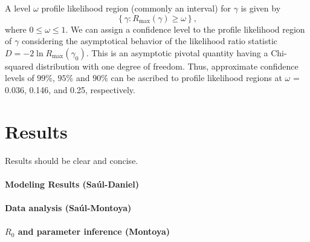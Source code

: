 A level $\omega$ profile likelihood region (commonly an interval) for $\gamma$ is given by
\begin{equation}
    \left\{\gamma: R_{\max}\left(\gamma\right) \geq \omega \right\}, \nonumber
\end{equation}
where $0 \leq \omega \leq 1$. We can assign a confidence level to the
profile likelihood region of $\gamma$  considering the asymptotical
behavior of the likelihood ratio statistic
$D=-2\ln{R_{\max}\left(\gamma_{0}\right)}$. This is an asymptotic
pivotal quantity having a Chi-squared distribution with one degree of
freedom. Thus, approximate confidence levels of $99\%$, $95\%$ and
$90\%$ can be ascribed to profile likelihood regions at $\omega$ =
0.036, 0.146, and 0.25, respectively.
\section{Results}
        Results should be clear and concise.
        \paragraph{Modeling Results (Saúl-Daniel)}

\paragraph{Data analysis (Saúl-Montoya)}
        \paragraph{$R_0$ and parameter inference (Montoya)}
